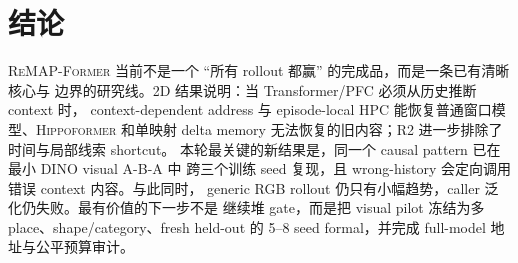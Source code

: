 \documentclass{article}
\newcommand{\model}{\textsc{ReMAP-Former}}
\newcommand{\base}{\textsc{Hippoformer}}
\begin{document}
\section{结论}

\model{} 当前不是一个 ``所有 rollout 都赢'' 的完成品，而是一条已有清晰核心与
边界的研究线。2D 结果说明：当 Transformer/PFC 必须从历史推断 context 时，
context-dependent address 与 episode-local HPC 能恢复普通窗口模型、\base{}
和单映射 delta memory 无法恢复的旧内容；R2 进一步排除了时间与局部线索 shortcut。
本轮最关键的新结果是，同一个 causal pattern 已在最小 DINO visual A-B-A 中
跨三个训练 seed 复现，且 wrong-history 会定向调用错误 context 内容。与此同时，
generic RGB rollout 仍只有小幅趋势，caller 泛化仍失败。最有价值的下一步不是
继续堆 gate，而是把 visual pilot 冻结为多 place、shape/category、fresh held-out
的 5--8 seed formal，并完成 full-model 地址与公平预算审计。

\begingroup
\footnotesize
\setlength{\bibsep}{1pt}


\endgroup
\end{document}
